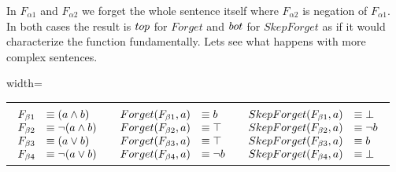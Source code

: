In $F_{\alpha1}$ and $F_{\alpha2}$ we forget the whole sentence itself where $F_{\alpha2}$ is negation of $F_{\alpha1}$.
In both cases the result is $\\top$ for $Forget$ and $\\bot$ for $SkepForget$ as if it would characterize the function fundamentally.
Lets see what happens with more complex sentences.\\
\begin{adjustbox}{width=\textwidth}
\begin{tabular}{ c  c  c }
 &  &  \\
$\begin{array}{l l}
F_{\beta1} &\equiv (a \land b)\\
F_{\beta2} &\equiv \lnot (a \land b)\\
F_{\beta3} &\equiv (a \lor b)\\
F_{\beta4} &\equiv \lnot (a \lor b)\\
\end{array}$ & $\begin{array}{l l}
Forget(F_{\beta1},a) &\equiv b\\
Forget(F_{\beta2},a) &\equiv \top\\
Forget(F_{\beta3},a) &\equiv \top\\
Forget(F_{\beta4},a) &\equiv \lnot b\\
\end{array}$ & $\begin{array}{l l}
SkepForget(F_{\beta1},a) &\equiv \bot\\
SkepForget(F_{\beta2},a) &\equiv \lnot b\\
SkepForget(F_{\beta3},a) &\equiv b\\
SkepForget(F_{\beta4},a) &\equiv \bot\\
\end{array}$\\
\end{tabular}
\end{adjustbox}\newline\newline

